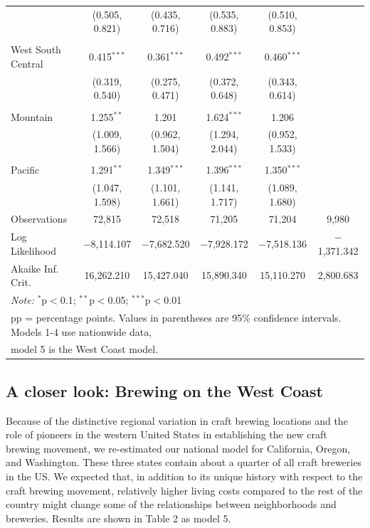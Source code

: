 \documentclass[]{article}
\begin{document}
\begin{landscape}
\begin{longtable}[c]{@{}lccccc@{}}
  & (0.505, 0.821) & (0.435, 0.716) & (0.535, 0.883) & (0.510, 0.853) &  \\ 
  & & & & & \\ 
 West South Central & 0.415$^{***}$ & 0.361$^{***}$ & 0.492$^{***}$ & 0.460$^{***}$ &  \\ 
  & (0.319, 0.540) & (0.275, 0.471) & (0.372, 0.648) & (0.343, 0.614) &  \\ 
  & & & & & \\ 
 Mountain & 1.255$^{**}$ & 1.201 & 1.624$^{***}$ & 1.206 &  \\ 
  & (1.009, 1.566) & (0.962, 1.504) & (1.294, 2.044) & (0.952, 1.533) &  \\ 
  & & & & & \\ 
 Pacific & 1.291$^{**}$ & 1.349$^{***}$ & 1.396$^{***}$ & 1.350$^{***}$ &  \\ 
  & (1.047, 1.598) & (1.101, 1.661) & (1.141, 1.717) & (1.089, 1.680) &  \\ 
\midrule
Observations & 72,815 & 72,518 & 71,205 & 71,204 & 9,980 \\ 
Log Likelihood & $-$8,114.107 & $-$7,682.520 & $-$7,928.172 & $-$7,518.136 & $-$1,371.342 \\ 
Akaike Inf. Crit. & 16,262.210 & 15,427.040 & 15,890.340 & 15,110.270 & 2,800.683 \\ 
\bottomrule
\multicolumn{6}{l}{\textit{Note:} $^{*}$p$<$0.1; $^{**}$p$<$0.05; $^{***}$p$<$0.01} \\ 
\multicolumn{6}{l}{pp = percentage points. Values in parentheses are 95\% confidence intervals. Models 1-4 use nationwide data, } \\
\multicolumn{6}{l}{model 5 is the West Coast model.}
\end{longtable}
\end{landscape}

\subsection{A closer look: Brewing on the West
Coast}\label{a-closer-look-brewing-on-the-west-coast}

Because of the distinctive regional variation in craft brewing locations
and the role of pioneers in the western United States in establishing
the new craft brewing movement, we re-estimated our national model for
California, Oregon, and Washington. These three states contain about a
quarter of all craft breweries in the US. We expected that, in addition
to its unique history with respect to the craft brewing movement,
relatively higher living costs compared to the rest of the country might
change some of the relationships between neighborhoods and breweries.
Results are shown in Table 2 as model 5.
\end{document}
